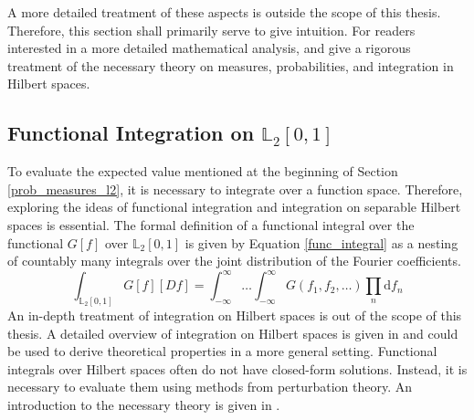 \documentclass[12pt, a4paper]{article}
\theoremstyle{MAstyle} \newtheorem{assumption}{Assumption}[section]
\theoremstyle{MAstyle} \newtheorem{definition}{Definition}[section]
\theoremstyle{MAstyle} \newtheorem{theorem}{Theorem}[section]
\begin{document}
			A more detailed treatment of these aspects is outside the scope of this thesis. Therefore, this section shall primarily serve to give intuition. For readers interested in a more detailed mathematical analysis, \cite{gihman_theory_2004} and \cite{skorohod_integration_1974} give a rigorous treatment of the necessary theory on measures, probabilities, and integration in Hilbert spaces. 
		
		\subsection{Functional Integration on $\mathbb{L}_2[0,1]$}\label{Integration}
			To evaluate the expected value mentioned at the beginning of Section \ref{prob_measures_l2}, it is necessary to integrate over a function space. Therefore, exploring the ideas of functional integration and integration on separable Hilbert spaces is essential. 
			The formal definition of a functional integral over the functional $G[f]$ over $\mathbb{L}_2[0,1]$ is given by Equation \ref{func_integral} as a nesting of countably many integrals over the joint distribution of the Fourier coefficients. 
			\begin{equation}\label{func_integral}
				\int_{\mathbb{L}_2[0,1]} G\left[f\right] \left[Df\right] = \int_{-\infty}^{\infty}\dots\int_{-\infty}^{\infty} G\left(f_1, f_2, \dots\right) \prod_{n} \mathrm{d}f_n
			\end{equation}
			An in-depth treatment of integration on Hilbert spaces is out of the scope of this thesis. A detailed overview of integration on Hilbert spaces is given in \cite{skorohod_integration_1974} and could be used to derive theoretical properties in a more general setting. Functional integrals over Hilbert spaces often do not have closed-form solutions. Instead, it is necessary to evaluate them using methods from perturbation theory. An introduction to the necessary theory is given in \cite{jeribi_perturbation_2021}.\\
			
\end{document}
